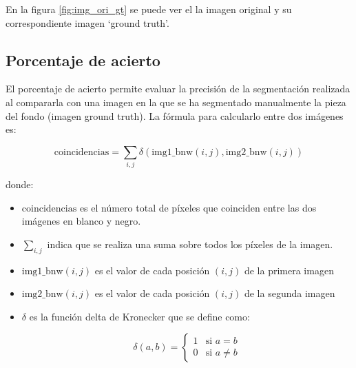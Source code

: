 En la figura \ref{fig:img_ori_gt} se puede ver el la imagen original y su correspondiente imagen `ground truth'.


\subsection{Porcentaje de acierto}\label{porcentaje-de-acierto}

El porcentaje de acierto permite evaluar la precisión de la segmentación realizada al compararla con una imagen en la que se ha segmentado manualmente la pieza del fondo (imagen ground truth). La fórmula para calcularlo entre dos imágenes es:

$$\text{coincidencias} = \sum_{i,j} \delta(\text{img1\_bnw}(i,j), \text{img2\_bnw}(i,j))$$

donde:

\begin{itemize}
\setlength{\itemsep}{-1ex}
    \item{\begin{flushleft}  $\text{coincidencias}$ es el número total de píxeles que coinciden entre las dos imágenes en blanco y negro. \end{flushleft}}
    \item{\begin{flushleft} $\sum_{i,j}$ indica que se realiza una suma sobre todos los píxeles de la imagen. \end{flushleft}}
    \item{\begin{flushleft} $\text{img1\_bnw}(i,j)$ es el valor de cada posición $(i,j)$ de la primera imagen \end{flushleft}}
    \item{\begin{flushleft} $\text{img2\_bnw}(i,j)$ es el valor de cada posición $(i,j)$ de la segunda imagen \end{flushleft}}
    \item{\begin{flushleft} $\delta$ es la función delta de Kronecker que se define como:

    $$\delta(a, b) = 
    \begin{cases} 
    1 & \text{si } a = b \\
    0 & \text{si } a \neq b 
    \end{cases}$$
    \end{flushleft}}
\end{itemize}


